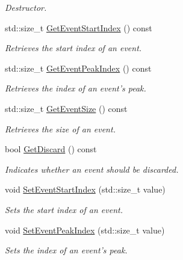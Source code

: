 \begin{DoxyCompactItemize}
\begin{DoxyCompactList}\small\item\em Destructor. \item\end{DoxyCompactList}\item 
std::size\_\-t \hyperlink{classstf_1_1Event_a1ed7132d749cc661ac4bbf1d1be066f0}{GetEventStartIndex} () const 
\begin{DoxyCompactList}\small\item\em Retrieves the start index of an event. \item\end{DoxyCompactList}\item 
std::size\_\-t \hyperlink{classstf_1_1Event_adace5488a38346b3420ec6878dbcef27}{GetEventPeakIndex} () const 
\begin{DoxyCompactList}\small\item\em Retrieves the index of an event's peak. \item\end{DoxyCompactList}\item 
std::size\_\-t \hyperlink{classstf_1_1Event_ac2e79cea403141bd2ff4d8578b70eb4a}{GetEventSize} () const 
\begin{DoxyCompactList}\small\item\em Retrieves the size of an event. \item\end{DoxyCompactList}\item 
bool \hyperlink{classstf_1_1Event_a2a31181298f0abaeae1ea38baebe89ef}{GetDiscard} () const 
\begin{DoxyCompactList}\small\item\em Indicates whether an event should be discarded. \item\end{DoxyCompactList}\item 
void \hyperlink{classstf_1_1Event_a751e0e4136119571080c234251420457}{SetEventStartIndex} (std::size\_\-t value)
\begin{DoxyCompactList}\small\item\em Sets the start index of an event. \item\end{DoxyCompactList}\item 
void \hyperlink{classstf_1_1Event_afa8ecb914cc1e72ede33463a8f249ecd}{SetEventPeakIndex} (std::size\_\-t value)
\begin{DoxyCompactList}\small\item\em Sets the index of an event's peak. \item\end{DoxyCompactList}\item 

\end{DoxyCompactItemize}
